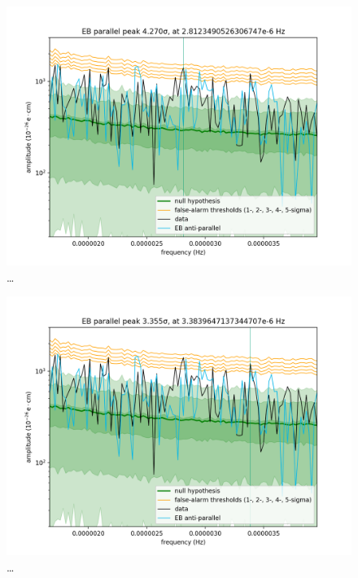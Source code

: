 \begin{figure}
  \centering
  \includegraphics[width=\linewidth]{gfx/axions/P_detection_peak_123.png}
  \caption{\ldots}
  \label{fig:P_detection_peak_123}
\end{figure}
\begin{figure}
  \centering
  \includegraphics[width=\linewidth]{gfx/axions/P_detection_peak_148.png}
  \caption{\ldots}
  \label{fig:P_detection_peak_148}
\end{figure}
